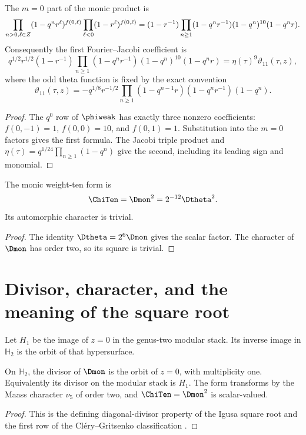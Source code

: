 \begin{proposition}
The $m=0$ part of the monic product is
\[
 \prod_{n>0,\ell\in Z}(1-q^nr^\ell)^{f(0,\ell)}
 \prod_{\ell<0}(1-r^\ell)^{f(0,\ell)}
 =(1-r^{-1})\prod_{n\ge1}
 (1-q^nr^{-1})(1-q^n)^{10}(1-q^nr).
\]
Consequently the first Fourier--Jacobi coefficient is
\[
 q^{1/2}r^{1/2}(1-r^{-1})
 \prod_{n\ge1}(1-q^nr^{-1})(1-q^n)^{10}(1-q^nr)
 =\eta(\tau)^9\vartheta_{11}(\tau,z),
\]
where the odd theta function is fixed by the exact convention
\[
 \vartheta_{11}(\tau,z)
 =-q^{1/8}r^{-1/2}
 \prod_{n\ge1}(1-q^{n-1}r)(1-q^nr^{-1})(1-q^n).
\]
\end{proposition}
\begin{proof}
The $q^0$ row of $\phiweak$ has exactly three nonzero coefficients:
$f(0,-1)=1$, $f(0,0)=10$, and $f(0,1)=1$. Substitution into the $m=0$ factors gives the first formula. The Jacobi triple product and $\eta(\tau)=q^{1/24}\prod_{n\ge1}(1-q^n)$ give the second, including its leading sign and monomial.
\end{proof}

\begin{corollary}
The monic weight-ten form is
\[
 \ChiTen=\Dmon^2=2^{-12}\Dtheta^2.
\]
Its automorphic character is trivial.
\end{corollary}
\begin{proof}
The identity $\Dtheta=2^6\Dmon$ gives the scalar factor.  The character of $\Dmon$ has order two, so its square is trivial.
\end{proof}

\section{Divisor, character, and the meaning of the square root}
Let \(H_1\) be the image of \(z=0\) in the genus-two modular
stack. Its inverse image in \(\mathbb H_2\) is the orbit of
that hypersurface.

\begin{theorem}
On \(\mathbb H_2\), the divisor of $\Dmon$ is the orbit of
\(z=0\), with multiplicity one. Equivalently its divisor on the
modular stack is \(H_1\). The form transforms by the Maass character $\nu_5$ of order two, and $\ChiTen=\Dmon^2$ is scalar-valued.
\end{theorem}
\begin{proof}
This is the defining diagonal-divisor property of the Igusa square root and the first row of the Cl\'ery--Gritsenko classification \cite{Igusa62,Igusa64,GC}.
\end{proof}

